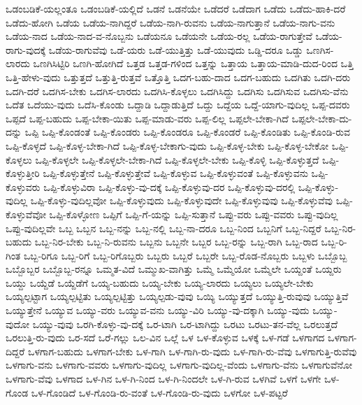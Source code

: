 {ಒಡಂಬಡಿಕೆ-ಯಲ್ಲಂತೂ
ಒಡಂಬಡಿಕೆ-ಯಲ್ಲಿದೆ
ಒಡನೆ
ಒಡನೆಯೇ
ಒಡೆದರೆ
ಒಡೆದಾಗ
ಒಡೆದು
ಒಡೆದು-ಹಾಕಿ-ದರೆ
ಒಡೆದು-ಹೋಗಿ
ಒಡೆಯ
ಒಡೆಯ-ನಾಗಿದ್ದರೆ
ಒಡೆಯ-ನಾಗಿ-ರುವನು
ಒಡೆಯ-ನಾಗುತ್ತಾನೆ
ಒಡೆಯ-ನಾಗು-ವನು
ಒಡೆಯ-ನಾದ
ಒಡೆಯ-ನಾದ-ವ-ನೊಬ್ಬನು
ಒಡೆಯನೂ
ಒಡೆಯನೇ
ಒಡೆಯ-ರಲ್ಲ
ಒಡೆಯ-ರಾಗುತ್ತೇವೆ
ಒಡೆಯ-ರಾಗು-ವುದಕ್ಕೆ
ಒಡೆಯ-ರಾಗುವೆವು
ಒಡೆ-ಯರು
ಒಡೆ-ಯುತ್ತಿತ್ತು
ಒಡೆ-ಯುವುದು
ಒಡ್ಡಿ-ದರೂ
ಒಡ್ಡು
ಒಣಗಿಸ-ಲಾರದು
ಒಣಗಿಸಿಟ್ಟಿರಿ
ಒಣಗಿ-ಹೋಗಿದೆ
ಒತ್ತಡ
ಒತ್ತಡ-ಗಳಿಂದ
ಒತ್ತನ್ನು
ಒತ್ತಾಯ
ಒತ್ತಾಯ-ಮಾಡಿ-ದುದ-ರಿಂದ
ಒತ್ತಿ
ಒತ್ತಿ-ಹೇಳು-ವುದು
ಒತ್ತುತ್ತದೆ
ಒತ್ತುತ್ತಿ-ರುತ್ತವೆ
ಒತ್ತೊತ್ತಿ
ಒದಗ-ಬಹು-ದಾದ
ಒದಗ-ಬಹುದು
ಒದಗಿತು
ಒದಗಿ-ದರು
ಒದಗಿ-ದರೆ
ಒದಗಿಸ-ಬೇಕು
ಒದಗಿಸ-ಲಾರದು
ಒದಗಿಸಿ-ಕೊಳ್ಳಲು
ಒದಗಿಸಿದ್ದು
ಒದಗಿಸು
ಒದಗಿಸುವ
ಒದಗಿಸು-ವೆನು
ಒದೆತ
ಒದೆಯು-ವುದು
ಒದೆಸಿ-ಕೊಂಡು
ಒದ್ದಾಡಿ
ಒದ್ದಾಡುತ್ತಿದೆ
ಒದ್ದು
ಒದ್ದೆಯ
ಒದ್ದೆ-ಯಾಗು-ವುದಿಲ್ಲ
ಒಪ್ಪ-ದವರು
ಒಪ್ಪದೆ
ಒಪ್ಪ-ಬಹುದು
ಒಪ್ಪ-ಬೇಕಾ-ಯಿತು
ಒಪ್ಪ-ಮಾಡು-ವರು
ಒಪ್ಪ-ಲಿಲ್ಲ
ಒಪ್ಪಲೇ-ಬೇಕಾ-ಗಿದೆ
ಒಪ್ಪಲೇ-ಬೇಕಾ-ದು-ದನ್ನು
ಒಪ್ಪಿ
ಒಪ್ಪಿ-ಕೊಂಡಂತೆ
ಒಪ್ಪಿ-ಕೊಂಡರು
ಒಪ್ಪಿ-ಕೊಂಡರೂ
ಒಪ್ಪಿ-ಕೊಂಡರೆ
ಒಪ್ಪಿ-ಕೊಂಡಿತು
ಒಪ್ಪಿ-ಕೊಂಡಿ-ರುವ
ಒಪ್ಪಿ-ಕೊಳ್ಳದೆ
ಒಪ್ಪಿ-ಕೊಳ್ಳ-ಬೇಕಾ-ಗಿದೆ
ಒಪ್ಪಿ-ಕೊಳ್ಳ-ಬೇಕಾಗು-ವುದು
ಒಪ್ಪಿ-ಕೊಳ್ಳ-ಬೇಕು
ಒಪ್ಪಿ-ಕೊಳ್ಳ-ಬೇಕೋ
ಒಪ್ಪಿ-ಕೊಳ್ಳಲು
ಒಪ್ಪಿ-ಕೊಳ್ಳಲೇ
ಒಪ್ಪಿ-ಕೊಳ್ಳಲೇ-ಬೇಕಾ-ಗಿದೆ
ಒಪ್ಪಿ-ಕೊಳ್ಳಲೇ-ಬೇಕು
ಒಪ್ಪಿ-ಕೊಳ್ಳಿ
ಒಪ್ಪಿ-ಕೊಳ್ಳುತ್ತದೆ
ಒಪ್ಪಿ-ಕೊಳ್ಳುತ್ತೀರಿ
ಒಪ್ಪಿ-ಕೊಳ್ಳುತ್ತೇನೆ
ಒಪ್ಪಿ-ಕೊಳ್ಳುತ್ತೇವೆ
ಒಪ್ಪಿ-ಕೊಳ್ಳುವ
ಒಪ್ಪಿ-ಕೊಳ್ಳುವಂತೆ
ಒಪ್ಪಿ-ಕೊಳ್ಳುವನು
ಒಪ್ಪಿ-ಕೊಳ್ಳುವರು
ಒಪ್ಪಿ-ಕೊಳ್ಳುವಿರಾ
ಒಪ್ಪಿ-ಕೊಳ್ಳು-ವು-ದಕ್ಕೆ
ಒಪ್ಪಿ-ಕೊಳ್ಳುವು-ದರ
ಒಪ್ಪಿ-ಕೊಳ್ಳುವು-ದರಲ್ಲಿ
ಒಪ್ಪಿ-ಕೊಳ್ಳು-ವುದಿಲ್ಲ
ಒಪ್ಪಿ-ಕೊಳ್ಳು-ವುದಿಲ್ಲವೋ
ಒಪ್ಪಿ-ಕೊಳ್ಳುವುದು
ಒಪ್ಪಿ-ಕೊಳ್ಳುವುದೇ
ಒಪ್ಪಿ-ಕೊಳ್ಳುವುವು
ಒಪ್ಪಿ-ಕೊಳ್ಳುವೆವು
ಒಪ್ಪಿ-ಕೊಳ್ಳುವೆವೋ
ಒಪ್ಪಿ-ಕೊಳ್ಳೋಣ
ಒಪ್ಪಿಗೆ
ಒಪ್ಪಿ-ಗೆ-ಯನ್ನು
ಒಪ್ಪಿ-ಸುತ್ತಾನೆ
ಒಪ್ಪು-ವರು
ಒಪ್ಪು-ವವರು
ಒಪ್ಪು-ವುದಿಲ್ಲ
ಒಪ್ಪು-ವುದಿಲ್ಲವೇ
ಒಬ್ಬ
ಒಬ್ಬನ
ಒಬ್ಬ-ನನ್ನು
ಒಬ್ಬ-ನಲ್ಲಿ
ಒಬ್ಬ-ನಾ-ದರೂ
ಒಬ್ಬ-ನಿಂದ
ಒಬ್ಬನಿಗೆ
ಒಬ್ಬ-ನಿದ್ದರೆ
ಒಬ್ಬ-ನಿರ-ಬಹುದು
ಒಬ್ಬ-ನಿರ-ಬೇಕು
ಒಬ್ಬ-ನಿ-ರುವನು
ಒಬ್ಬನು
ಒಬ್ಬನೇ
ಒಬ್ಬರ
ಒಬ್ಬ-ರನ್ನು
ಒಬ್ಬ-ರಾಗಿ
ಒಬ್ಬ-ರಾದ
ಒಬ್ಬ-ರಿ-ಗಿಂತ
ಒಬ್ಬ-ರಿಗೂ
ಒಬ್ಬ-ರಿಗೆ
ಒಬ್ಬ-ರಿಗೊಬ್ಬರು
ಒಬ್ಬರು
ಒಬ್ಬರೆ
ಒಬ್ಬರೇ
ಒಬ್ಬ-ರೊಡ-ನೊಬ್ಬರು
ಒಬ್ಬಳು
ಒಬ್ಬೊಬ್ಬ
ಒಬ್ಬೊಬ್ಬರ
ಒಬ್ಬೊಬ್ಬ-ರನ್ನೂ
ಒಮ್ಮತ-ವಿದೆ
ಒಮ್ಮುಖ-ವಾಗಿತ್ತು
ಒಮ್ಮೆ
ಒಮ್ಮೆಯೋ
ಒಮ್ಮೆಲೇ
ಒಯ್ದಂತೆ
ಒಯ್ದರು
ಒಯ್ದು
ಒಯ್ದೆಡೆ
ಒಯ್ದೆಡೆಗೆ
ಒಯ್ಯ-ಬಹುದು
ಒಯ್ಯ-ಬೇಕು
ಒಯ್ಯ-ಲಾರದು
ಒಯ್ಯಲು
ಒಯ್ಯಲೇ-ಬೇಕು
ಒಯ್ಯಲ್ಪಟ್ಟಾಗ
ಒಯ್ಯಲ್ಪಟ್ಟಿತು
ಒಯ್ಯಲ್ಪಟ್ಟಿತ್ತು
ಒಯ್ಯಲ್ಪಡು-ವುವು
ಒಯ್ಯಿ
ಒಯ್ಯುತ್ತದೆ
ಒಯ್ಯುತ್ತಿ-ರುವುವು
ಒಯ್ಯುತ್ತಿವೆ
ಒಯ್ಯುತ್ತೇನೆ
ಒಯ್ಯುವ
ಒಯ್ಯು-ವರು
ಒಯ್ಯುವ-ವನು
ಒಯ್ಯು-ವಿರಿ
ಒಯ್ಯು-ವು-ದಕ್ಕಾಗಿ
ಒಯ್ಯು-ವುದು
ಒಯ್ಯು-ವುದೋ
ಒಯ್ಯು-ವುವು
ಒರಗಿ-ಕೊಳ್ಳು-ವು-ದಕ್ಕೆ
ಒರ-ಟಾಗಿ
ಒರ-ಟಾಗಿದ್ದು
ಒರಟು
ಒರಟು-ತನ-ವೆಲ್ಲ
ಒರಲುತ್ತದೆ
ಒರಲುತ್ತಿ-ರು-ವುದು
ಒರ-ಸದೆ
ಒರೆ-ಗಲ್ಲು
ಒಲ-ವಿನ
ಒಲ್ಲೆ
ಒಳ
ಒಳ-ಕೊಳ್ಳುವ
ಒಳಕ್ಕೆ
ಒಳ-ಗಡೆ
ಒಳಗಾಗದ
ಒಳಗಾಗ-ದಿದ್ದರೆ
ಒಳಗಾಗ-ಬಹುದು
ಒಳಗಾಗ-ಬೇಕು
ಒಳ-ಗಾಗಿ
ಒಳ-ಗಾಗಿ-ರು-ವುದು
ಒಳ-ಗಾಗಿ-ರು-ವೆವು
ಒಳಗಾಗುತ್ತಿ-ರುವೆವು
ಒಳಗಾಗು-ವನು
ಒಳಗಾಗು-ವವರು
ಒಳಗಾಗು-ವುದಿಲ್ಲ
ಒಳಗಾಗು-ವುದಿಲ್ಲ-ವೆಂದು
ಒಳಗಾಗು-ವೆನು
ಒಳಗಾಗುವೆನೋ
ಒಳಗಾಗು-ವೆವು
ಒಳಗಾದ
ಒಳ-ಗಿನ
ಒಳ-ಗಿ-ನಿಂದ
ಒಳ-ಗಿ-ನಿಂದಲೇ
ಒಳ-ಗಿ-ರುವ
ಒಳಗಿವೆ
ಒಳಗೆ
ಒಳಗೇ
ಒಳ-ಗೊಂಡ
ಒಳ-ಗೊಂಡಿದೆ
ಒಳ-ಗೊಂಡಿ-ರು-ವಂತೆ
ಒಳ-ಗೊಂಡಿ-ರು-ವುದು
ಒಳಗೋ
ಒಳ-ಪಟ್ಟರೆ
}
